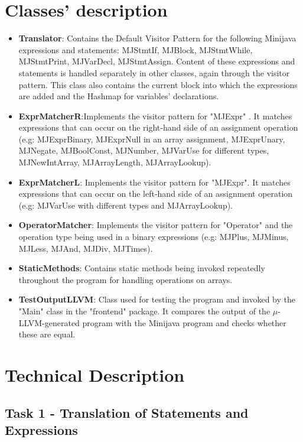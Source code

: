 \documentclass[paper=a4, fontsize=11pt]{scrartcl}
\numberwithin{equation}{section}		%
\numberwithin{figure}{section}			%
\numberwithin{table}{section}				%
\begin{document}
\section*{Classes' description}
\begin{itemize}
	\item \textbf{Translator}: Contains the Default Visitor Pattern for the following  Minijava expressions and statements: MJStmtIf, MJBlock, MJStmtWhile, MJStmtPrint, MJVarDecl, MJStmtAssign. Content of these expressions and statements is handled separately in other classes, again through the visitor pattern. This class also contains the current block into which the expressions are added and the Hashmap for variables' declarations.
	\item \textbf{ExprMatcherR}:Implements the visitor pattern for "MJExpr" . It matches expressions that can occur on the right-hand side of an assignment operation (e.g: MJExprBinary, MJExprNull in an array assignment, MJExprUnary, MJNegate, MJBoolConst, MJNumber, MJVarUse for different types, MJNewIntArray, MJArrayLength, MJArrayLookup). 
	\item \textbf{ExprMatcherL}: Implements the visitor pattern for "MJExpr". It matches expressions that can occur on the left-hand side of an assignment operation (e.g: MJVarUse with different types and MJArrayLookup). 
	\item \textbf{OperatorMatcher}: Implements the visitor pattern for "Operator" and the operation type being used in a binary expressions (e.g: MJPlus, MJMinus, MJLess, MJAnd, MJDiv, MJTimes). 
	\item \textbf{StaticMethods}: Contains static methods being invoked repeatedly throughout the program for handling operations on arrays. 
	\item \textbf{TestOutputLLVM}: Class used for testing the program and invoked by the "Main" class in the "frontend" package. It compares the output of the $\mu$-LLVM-generated program with the  Minijava program and checks whether these are equal. 
\end{itemize}

\section*{Technical Description}

\subsection*{Task 1 - Translation of Statements and Expressions}
\end{document}
